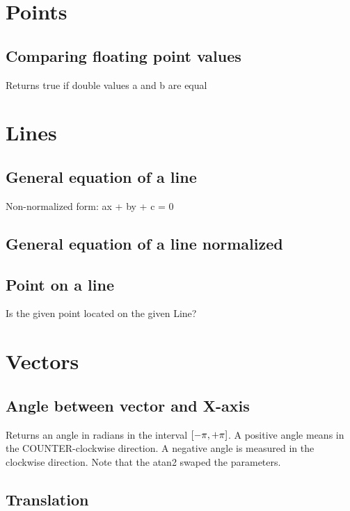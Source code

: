 \section{Points}
\subsection{Comparing floating point values}
Returns true if double values a and b are equal


\section{Lines}
\subsection{General equation of a line}
Non-normalized form: ax + by + c = 0

\subsection{General equation of a line normalized}

\subsection{Point on a line}
Is the given point located on the given Line?

\section{Vectors}

\subsection{Angle between vector and X-axis}
Returns an angle in radians in the interval $\interval{-\pi}{+\pi}$. A positive angle means in the COUNTER-clockwise direction. A negative angle is measured in the clockwise direction. Note that the atan2 swaped the parameters.

\subsection{Translation}

